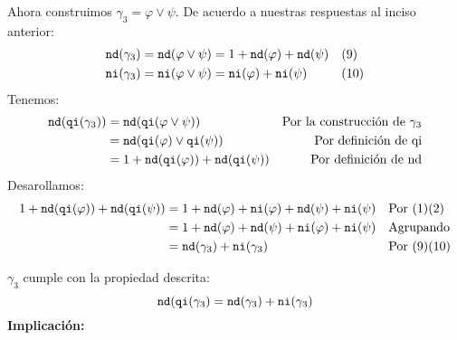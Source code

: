 \documentclass[8pt, letterpaper]{article}
\begin{document}
\begin{enumerate}
   Ahora construimos $\gamma_3 = \varphi \lor \psi$. De acuerdo a nuestras
   respuestas al inciso anterior:
   \begin{align*}
     {\tt nd}(\gamma_3) &= {\tt nd}(\varphi\lor\psi) = 1 +
     {\tt nd}(\varphi) + {\tt nd}(\psi)& &(9) \\
     {\tt ni}(\gamma_3) &= {\tt ni}(\varphi\lor\psi) =
     {\tt ni}(\varphi) + {\tt ni}(\psi)& &(10)
   \end{align*}
   Tenemos:
   \begin{align*}
     {\tt nd}({\tt qi}(\gamma_3)) &= {\tt nd}({\tt qi}(\varphi\lor
     \psi))& \text{Por la construcción de } \gamma_3 \\
     &= {\tt nd}({\tt qi}(\varphi)\lor{\tt qi}(\psi)) & \text{
       Por definición de qi} \\
     &= 1 + {\tt nd}({\tt qi}(\varphi)) + {\tt nd}({\tt qi}(\psi)) &
       \text{ Por definición de nd} \\
   \end{align*}
   Desarollamos:
   \begin{align*}
     1 + {\tt nd}({\tt qi}(\varphi)) + {\tt nd}({\tt qi}(\psi)) &= 1 +
     {\tt nd}(\varphi) + {\tt ni}(\varphi)+{\tt nd}(\psi) + {\tt ni}(\psi)
     & &\text{Por } (1)(2)\\
     &= 1+ {\tt nd}(\varphi) + {\tt nd}(\psi) + {\tt ni}(\varphi) +
     {\tt ni}(\psi) & &\text{Agrupando}\\
     &=  {\tt nd}(\gamma_3) + {\tt ni}(\gamma_3)& &\text{Por } (9)(10)
     \end{align*}

   $\gamma_3$ cumple con la propiedad descrita:
   $${\tt nd}({\tt qi}(\gamma_3) = {\tt nd}(\gamma_3) + {\tt ni}(\gamma_3)$$
   \hfill\break
   {\bf Implicación:}


\end{enumerate}
\end{document}
